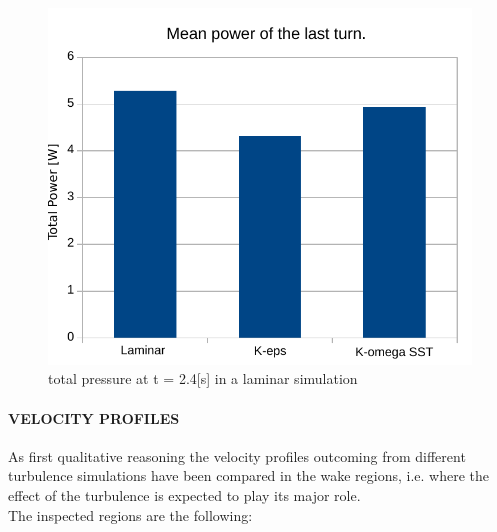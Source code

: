 \documentclass[a4paper,12pt]{article}
\begin{document}
\begin{figure}[H]
\centering
\includegraphics[width=14cm]{images/turbulence/MeanPower_comparison.pdf} 
\caption{total pressure at t = 2.4[s] in a laminar simulation}
\centering
\end{figure}



\paragraph{VELOCITY PROFILES}
As first qualitative reasoning the velocity profiles outcoming from different turbulence simulations have been compared in the wake regions, i.e. where the effect of the turbulence is expected to play its major role.\\
The inspected regions are the following:\\
\begin{figure}[H]
\centering
{}

\end{figure}
\end{document}
